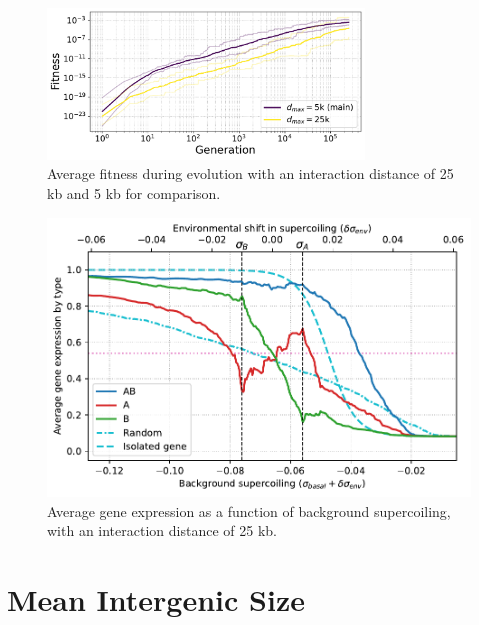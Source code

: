 \begin{figure}[H]
\centering
\includegraphics[width=0.75\textwidth]{param/interaction-25k/fitness_all_with_main.pdf}
\caption[Average fitness during evolution, with an interaction distance of 25 kb]{Average fitness during evolution with an interaction distance of 25 kb and 5 kb for comparison.}
\label{fig:param:inter25k-finess}
\end{figure}

\begin{figure}[H]
\centering
\includegraphics[width=\textwidth]{param/interaction-25k/activity_sigmas_avg.pdf}
\caption[Average gene expression as a function of background supercoiling, with an interaction distance of 25 kb]{Average gene expression as a function of background supercoiling, with an interaction distance of 25 kb.}
\label{fig:param:inter25k-activ-by-sigma}
\end{figure}

\FloatBlock






\section{Mean Intergenic Size}

